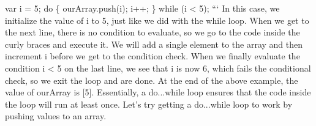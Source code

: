 \documentclass{article}%
\begin{document}
var i = 5;\newline%
do \{\newline%
  ourArray.push(i);\newline%
  i++;\newline%
\} while (i < 5);\newline%
```\newline%
In this case, we initialize the value of i to 5, just like we did with the while loop. When we get to the next line, there is no condition to evaluate, so we go to the code inside the curly braces and execute it.  We will add a single element to the array and then increment i before we get to the condition check. When we finally evaluate the condition i < 5 on the last line, we see that i is now 6, which fails the conditional check, so we exit the loop and are done. At the end of the above example, the value of ourArray is {[}5{]}.\newline%
Essentially, a do...while loop ensures that the code inside the loop will run at least once.\newline%
Let's try getting a do...while loop to work by pushing values to an array.\newline%

%
\end{document}
